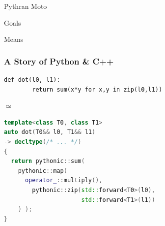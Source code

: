 \documentclass[aspectratio=1610]{beamer}
\begin{document}
\begin{frame}{Pythran Moto}
    \begin{block}{Goals}
        \begin{enumerate}
        \end{enumerate}
    \end{block}

    \begin{block}{Means}
        \begin{enumerate}
        \end{enumerate}
    \end{block}
\end{frame}

\begin{frame}[fragile]
    \frametitle{A Story of Python \& C++}
    \begin{lstlisting}
def dot(l0, l1):
        return sum(x*y for x,y in zip(l0,l1))
        \end{lstlisting}
        \vspace{-1em}
        \begin{center}
            \Large$\simeq$
        \end{center}
        \vspace{-1em}
    \begin{lstlisting}[language=c++]
template<class T0, class T1>
auto dot(T0&& l0, T1&& l1)
-> decltype(/* ... */)
{
  return pythonic::sum(
    pythonic::map(
      operator_::multiply(),
        pythonic::zip(std::forward<T0>(l0),
                      std::forward<T1>(l1))
    ) );
}
        \end{lstlisting}
\end{frame}
\end{document}
